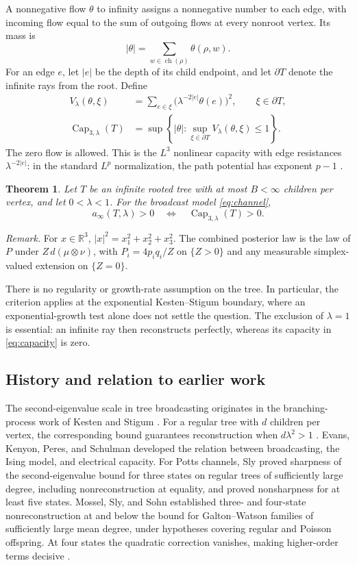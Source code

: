 \documentclass[11pt]{article}
\newtheorem{theorem}{Theorem}[section]
\numberwithin{equation}{section}
\newcommand{\Capacity}{\operatorname{Cap}}
\newcommand{\children}{\operatorname{ch}}
\begin{document}
A nonnegative flow $\theta$ to infinity assigns a nonnegative
number to each edge, with incoming flow equal to the sum of outgoing
flows at every nonroot vertex. Its mass is
\[
 |\theta|=\sum_{w\in\children(\rho)}\theta(\rho,w).
\]
For an edge $e$, let $|e|$ be the depth of its child endpoint,
and let $\partial T$ denote the infinite rays from the root.
Define
\begin{align}
 V_\lambda(\theta,\xi)
   &=\sum_{e\in\xi}\bigl(\lambda^{-2|e|}\theta(e)\bigr)^2,
       \qquad \xi\in\partial T,\label{eq:potential}\\
 \Capacity_{3,\lambda}(T)
   &=\sup\left\{|\theta|:
       \sup_{\xi\in\partial T}V_\lambda(\theta,\xi)\leq1\right\}.
       \label{eq:capacity}
\end{align}
The zero flow is allowed. This is the $L^3$ nonlinear capacity
with edge resistances $\lambda^{-2|e|}$: in the standard $L^p$
normalization, the path potential has exponent $p-1$
\cite[Section~2]{PP10}.

\begin{theorem}\label{thm:main}
Let $T$ be an infinite rooted tree with at most $B<\infty$
children per vertex, and let $0<\lambda<1$. For the broadcast
model \eqref{eq:channel},
\[
 a_\infty(T,\lambda)>0
 \quad\Longleftrightarrow\quad
 \Capacity_{3,\lambda}(T)>0.
\]
\end{theorem}

\noindent\textit{Remark.} For $x\in\mathbb R^3$, $|x|^2=x_1^2+x_2^2+x_3^2$. The combined posterior law is the law of $P$ under $Z\,d(\mu\otimes\nu)$, with $P_i=4p_iq_i/Z$ on $\{Z>0\}$ and any measurable simplex-valued extension on $\{Z=0\}$.


There is no regularity or growth-rate assumption on the tree.
In particular, the criterion applies at the exponential
Kesten--Stigum boundary, where an exponential-growth test alone
does not settle the question. The exclusion of $\lambda=1$ is
essential: an infinite ray then reconstructs perfectly, whereas
its capacity in \eqref{eq:capacity} is zero.

\subsection*{History and relation to earlier work}
The second-eigenvalue scale in tree broadcasting originates in
the branching-process work of Kesten and Stigum \cite{KS66}.
For a regular tree with $d$ children per vertex, the corresponding
bound guarantees reconstruction when $d\lambda^2>1$
\cite{MP03}. Evans, Kenyon, Peres, and Schulman
\cite{EKPS00} developed the relation between broadcasting, the
Ising model, and electrical capacity. For Potts channels, Sly
\cite{Sly11} proved sharpness of the second-eigenvalue bound for
three states on regular trees of sufficiently large degree,
including nonreconstruction at equality, and proved nonsharpness
for at least five states. Mossel, Sly, and Sohn \cite{MSS25}
established three- and four-state nonreconstruction at and below
the bound for Galton--Watson families of sufficiently large mean
degree, under hypotheses covering regular and Poisson offspring.
At four states the quadratic correction vanishes, making
higher-order terms decisive \cite{Sly11,MSS25}.
\end{document}
